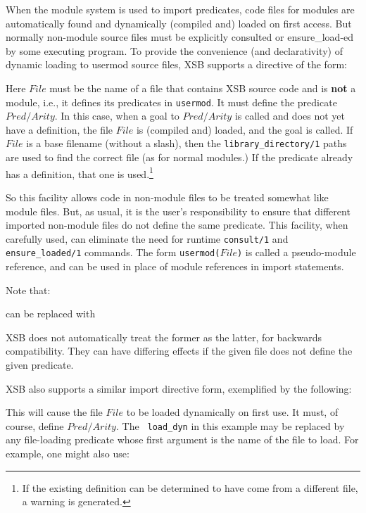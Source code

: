 When the module system is used to import predicates, code files for
modules are automatically found and dynamically (compiled and) loaded
on first access.  But normally non-module source files must be
explicitly consulted or ensure\_load-ed by some executing program.  To
provide the convenience (and declarativity) of dynamic loading to
usermod source files, XSB supports a directive of the form:


\noindent Here $File$ must be the name of a file that contains XSB
source code and is {\bf not} a module, i.e., it defines its predicates
in {\tt usermod}.  It must define the predicate $Pred/Arity$.  In this
case, when a goal to $Pred/Arity$ is called and does not yet have a
definition, the file $File$ is (compiled and) loaded, and the goal is
called.  If $File$ is a base filename (without a slash), then the
{\tt library\_directory/1} paths are used to find the correct file (as
for normal modules.)  If the predicate already has a definition, that
one is used.\footnote{If the existing definition can be determined to
  have come from a different file, a warning is generated.}

So this facility allows code in non-module files to be treated
somewhat like module files.  But, as usual, it is the user's
responsibility to ensure that different imported non-module files do
not define the same predicate.  This facility, when carefully used,
can eliminate the need for runtime {\tt consult/1} and {\tt
  ensure\_loaded/1} commands.  The form {\tt usermod($File$)} is
called a pseudo-module reference, and can be used in place of module
references in import statements.

Note that:


\noindent can be replaced with

  
\noindent XSB does not automatically treat the former as the latter,
for backwards compatibility.  They can have differing effects if the
given file does not define the given predicate.

XSB also supports a similar import directive form, exemplified by the
following:


\noindent This will cause the file $File$ to be loaded dynamically on
first use.  It must, of course, define $Pred/Arity$.  The {\tt
  load\_dyn} in this example may be replaced by any file-loading
predicate whose first argument is the name of the file to load.  For
example, one might also use:

